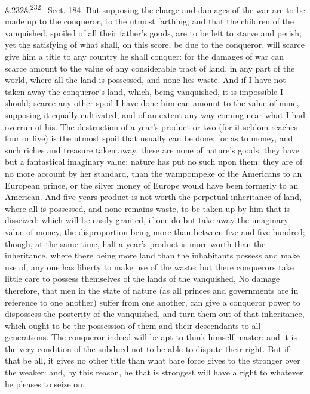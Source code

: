 \documentclass[12pt]{article}
\newcommand{\para}[1][]{\par\noindent\ifx&#1&\else\textsuperscript{\footnotesize #1}~\fi}
\begin{document}
\para[232] Sect. 184. But supposing the charge and damages of the war are to be made up to the conqueror, to the utmost farthing; and that the children of the vanquished, spoiled of all their father's goods, are to be left to starve and perish; yet the satisfying of what shall, on this score, be due to the conqueror, will scarce give him a title to any country he shall conquer: for the damages of war can scarce amount to the value of any considerable tract of land, in any part of the world, where all the land is possessed, and none lies waste. And if I have not taken away the conqueror's land, which, being vanquished, it is impossible I should; scarce any other spoil I have done him can amount to the value of mine, supposing it equally cultivated, and of an extent any way coming near what I had overrun of his. The destruction of a year's product or two (for it seldom reaches four or five) is the utmost spoil that usually can be done: for as to money, and such riches and treasure taken away, these are none of nature's goods, they have but a fantastical imaginary value: nature has put no such upon them: they are of no more account by her standard, than the wampompeke of the Americans to an European prince, or the silver money of Europe would have been formerly to an American. And five years product is not worth the perpetual inheritance of land, where all is possessed, and none remains waste, to be taken up by him that is disseized: which will be easily granted, if one do but take away the imaginary value of money, the disproportion being more than between five and five hundred; though, at the same time, half a year's product is more worth than the inheritance, where there being more land than the inhabitants possess and make use of, any one has liberty to make use of the waste: but there conquerors take little care to possess themselves of the lands of the vanquished, No damage therefore, that men in the state of nature (as all princes and governments are in reference to one another) suffer from one another, can give a conqueror power to dispossess the posterity of the vanquished, and turn them out of that inheritance, which ought to be the possession of them and their descendants to all generations. The conqueror indeed will be apt to think himself master: and it is the very condition of the subdued not to be able to dispute their right. But if that be all, it gives no other title than what bare force gives to the stronger over the weaker: and, by this reason, he that is strongest will have a right to whatever he pleases to seize on.
\end{document}
